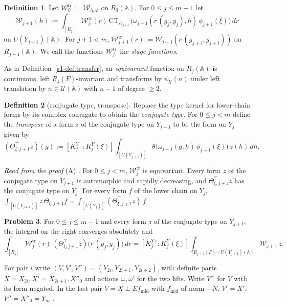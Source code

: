 \documentclass[reqno]{amsart}
\theoremstyle{definition}
\newtheorem{problem}{Problem}[section]
\newtheorem{definition}[problem]{Definition}
\theoremstyle{plain}
\theoremstyle{remark}
\newcommand{\A}{\mathbb{A}}
\newcommand{\Uc}{\mathcal{U}}
\newcommand{\Wc}{\mathcal{W}}
\newcommand{\st}{\mathrm{st}}
\newcommand{\CT}{\mathrm{CT}}
\newcommand{\fm}{f_{\mathrm{mid}}}
\newcommand{\Wtr}{\Wc^{\mathrm{tr}}}
\begin{document}
\begin{definition}\label{def:stage}
Let \(\Wtr_0 := \Wc_{\lambda,\varphi}\) on \(R_0(\A)\).  For \(0 \le j \le m - 1\) let
\[
  \Wc_{j+1}(h) := \int_{[R_j]} \Wtr_j(r)\,\CT_{\st_{j+1}}\bigl(\omega_{j+1}(r\,(g_j, y_j), h)\,\phi_{j+1}(\xi)\bigr)\,dr
\]
on \(U(Y_{j+1})(\A)\).  For \(j + 1 < m\), \(\Wtr_{j+1}(r) := \Wc_{j+1}(r\,(g_{j+1}, y_{j+1}))\) on \(R_{j+1}(\A)\).  We call the functions \(\Wtr_j\) the \emph{stage functions}.
\end{definition}

As in Definition~\ref{s1-def:transfer}, an \emph{equivariant} function on \(R_j(\A)\) is continuous, left \(R_j(F)\)-invariant and transforms by \(\psi_\Uc(n)\) under left translation by \(n\in\Uc(\A)\) with \(n-1\) of degree \(\ge2\).

\begin{definition}[conjugate type, transpose]\label{def:transpose}
Replace the type kernel for lower-chain forms by its complex conjugate to obtain the \emph{conjugate type}.  For \(0\le j<m\) define the \emph{transpose} of a form \(z\) of the conjugate type on \(Y_{j+1}\) to be the form on \(Y_j\) given by
\[
  (\Theta_{\xi,j+1}^{\top} z)(g) := [K^{Y\circ}_j : K^Y_j(\xi)] \int_{[U(Y_{j+1})]} \theta\bigl(\omega_{j+1}(g, h)\,\phi_{j+1}(\xi)\bigr)\, z(h)\,dh .
\]
\end{definition}

\emph{Read from the proof} (A) \cite[UnfoldingStages, line 657, and SeesawIdentity, lines 168--201, 260]{GL}.  For \(0\le j<m\), \(\Wtr_j\) is equivariant.  Every form \(z\) of the conjugate type on \(Y_{j+1}\) is automorphic and rapidly decreasing, and \(\Theta^\top_{\xi,j+1}z\) has the conjugate type on \(Y_j\).  For every form \(f\) of the lower chain on \(Y_j\), \(\int_{[U(Y_{j+1})]}z\,\Theta_{\xi,j+1}f=\int_{[U(Y_j)]}(\Theta^\top_{\xi,j+1}z)\,f\).

\begin{problem}\label{pr:stage}
For \(0 \le j \le m-1\) and every form \(z\) of the conjugate type on \(Y_{j+1}\), the integral on the right converges absolutely and
\[
  \int_{[R_j]} \Wtr_j(r)\,(\Theta^{\top}_{\xi,j+1} z)\bigl(r\,(g_j, y_j)\bigr)\,dr = [K^{Y\circ}_j : K^Y_j(\xi)] \int_{R_{j+1}(F)\backslash U(Y_{j+1})(\A)} \Wc_{j+1}\, z .
\]
\end{problem}

For pair \(i\) write \((V,V',V'')=(Y_{2i},Y_{2i+1},Y_{2i+2})\), with definite parts \(X=X_{2i},X'=X_{2i+1},X''_0\) and actions \(\omega,\omega'\) for the two lifts.  Write \(V^-\) for \(V\) with its form negated.  In the last pair \(V=X\perp E\fm\) with \(\fm\) of norm \(-N\), \(V'=X'\), \(V''=X''_0=Y_m\) \cite[EdgePairEvaluation, lines 1086--1117, 1144--1175]{GL}.
\end{document}

